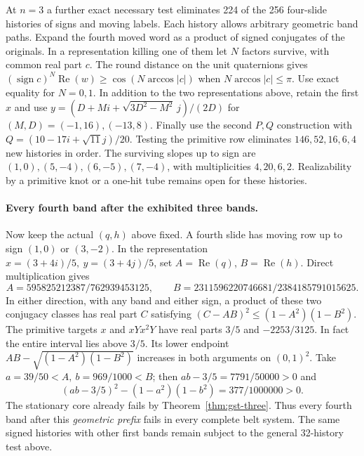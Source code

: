 \documentclass[11pt,letterpaper]{article}
\numberwithin{equation}{section}
\theoremstyle{remark}
\begin{document}
At \(n=3\) a further exact necessary test eliminates 224 of the
256 four-slide histories of signs and moving labels. Each history
allows arbitrary geometric band paths. Expand the fourth moved word
as a product of signed conjugates of the originals. In a representation
killing one of them let \(N\) factors survive, with common real part
\(c\). The round distance on the unit quaternions gives
\((\operatorname{sign}c)^N\operatorname{Re}(w)\ge
 \cos(N\arccos|c|)\) when \(N\arccos|c|\le\pi\).
Use exact equality for \(N=0,1\). In addition to the two
representations above, retain the first \(x\) and use
\(y=(D+Mi+\sqrt{3D^2-M^2}\,j)/(2D)\) for
\((M,D)=(-1,16),(-13,8)\). Finally use the second \(P,Q\)
construction with \(Q=(10-17i+\sqrt{11}j)/20\).
Testing the primitive row eliminates \(146,52,16,6,4\) new histories
in order. The surviving slopes up to sign are \((1,0),(5,-4),
(6,-5),(7,-4)\), with multiplicities \(4,20,6,2\). Realizability
by a primitive knot or a one-hit tube remains open for these histories.

\paragraph{Every fourth band after the exhibited three bands.}
Now keep the actual \((q,h)\) above fixed. A fourth slide has moving
row up to sign \((1,0)\) or \((3,-2)\). In the representation
\(x=(3+4i)/5,\ y=(3+4j)/5\), set \(A=\operatorname{Re}(q)\),
\(B=\operatorname{Re}(h)\). Direct multiplication gives
\[
 A=595825212387/762939453125,\qquad
 B=2311596220746681/2384185791015625 .
\]
In either direction, with any band and either sign, a product of
these two conjugacy classes has real part \(C\) satisfying
\((C-AB)^2\le(1-A^2)(1-B^2)\). The primitive targets \(x\)
and \(xYx^2Y\) have real parts \(3/5\) and \(-2253/3125\).
In fact the entire interval lies above \(3/5\). Its lower endpoint
\(AB-\sqrt{(1-A^2)(1-B^2)}\) increases in both arguments on
\((0,1)^2\). Take \(a=39/50<A,\ b=969/1000<B\); then
\(ab-3/5=7791/50000>0\) and
\[
 (ab-3/5)^2-(1-a^2)(1-b^2)=377/1000000>0 .
\]
The stationary
core already fails by Theorem~\ref{thm:gst-three}. Thus every fourth
band after this \emph{geometric prefix} fails in every complete belt
system. The same signed histories with other first bands remain
subject to the general 32-history test above.
\end{document}
